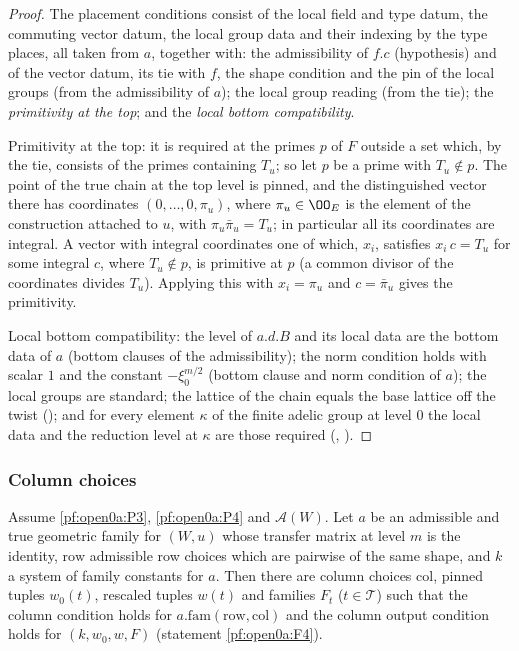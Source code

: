 \begin{proof}
The placement conditions consist of the local field and type datum, the commuting vector datum, the local group data and
their indexing by the type places, all taken from $a$, together with: the admissibility of $f.c$ (hypothesis) and of the
vector datum, its tie with $f$, the shape condition and the pin of the local groups (from the admissibility of $a$); the
local group reading (from the tie); the \emph{primitivity at the top}; and the \emph{local bottom compatibility}.

Primitivity at the top: it is required at the primes $p$ of $F$ outside a set which, by the tie, consists of the primes
containing $T_u$; so let $p$ be a prime with $T_u\notin p$. The point of the true chain at the top level is pinned, and the distinguished vector there has
coordinates $(0,\dots,0,\pi_u)$, where $\pi_u\in\OO_E$ is the element of the construction attached to $u$, with
$\pi_u\bar\pi_u=T_u$; in particular all its coordinates are integral. A vector with integral coordinates one of which,
$x_i$, satisfies $x_i\,c=T_u$ for some integral $c$, where $T_u\notin p$, is primitive at $p$ (a common divisor of the
coordinates divides $T_u$). Applying this with $x_i=\pi_u$ and $c=\bar\pi_u$ gives the primitivity.

Local bottom compatibility: the level of $a.d.B$ and its local data are the bottom data of $a$ (bottom clauses of the
admissibility); the norm condition holds with scalar $1$ and the constant $-\xi_0^{m/2}$ (bottom clause and norm
condition of $a$); the local groups are standard; the lattice of the chain equals the base lattice off the twist
(); and for every element $\kappa$ of the finite adelic
group at level $0$ the local data and the reduction level at $\kappa$ are those required
(, ).
\end{proof}

\subsubsection{Column choices}

\begin{proposition}\label{pf:open0a:colside}
Assume \ref{pf:open0a:P3}, \ref{pf:open0a:P4} and $\mathcal A(W)$. Let $a$ be an admissible and true geometric family
for $(W,u)$ whose transfer matrix at level $m$ is the identity, $\mathrm{row}$ admissible row choices which are pairwise
of the same shape, and $k$ a system of family constants for $a$. Then there are column choices $\mathrm{col}$, pinned
tuples $w_0(t)$, rescaled tuples $w(t)$ and families $F_t$ ($t\in\mathcal T$) such that the column condition holds for
$a.\mathrm{fam}(\mathrm{row},\mathrm{col})$ and the column output condition holds for $(k,w_0,w,F)$ (statement
\ref{pf:open0a:F4}).
\end{proposition}

